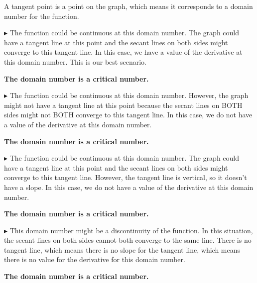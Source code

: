 \documentclass{ximera}
\begin{document}
A tangent point is a point on the graph, which means it corresponds to a domain number for the function. 


\textbf{\textcolor{blue!55!black}{$\blacktriangleright$}}  The function could be continuous at this domain number. The graph could have a tangent line at this point and the secant lines on both sides might converge to this tangent line.  In this case, we have a value of the derivative at this domain number. This is our best scenario. 

\begin{center}
\textbf{\textcolor{blue!55!black}{The domain number is a critical number.}}
\end{center}


\textbf{\textcolor{blue!55!black}{$\blacktriangleright$}}  The function could be continuous at this domain number.  However, the graph might not have a tangent line at this point because the secant lines on BOTH sides might not BOTH converge to this tangent line.  In this case, we do not have a value of the derivative at this domain number. 

\begin{center}
\textbf{\textcolor{blue!55!black}{The domain number is a critical number.}}
\end{center}

\textbf{\textcolor{blue!55!black}{$\blacktriangleright$}}  The function could be continuous at this domain number. The graph could have a tangent line at this point and the secant lines on both sides might converge to this tangent line.  However, the tangent line is vertical, so it doesn't have a slope. In this case, we do not have a value of the derivative at this domain number. 

\begin{center}
\textbf{\textcolor{blue!55!black}{The domain number is a critical number.}}
\end{center}

\textbf{\textcolor{blue!55!black}{$\blacktriangleright$}}  This domain number might be a discontinuity of the function. In this situation, the secant lines on both sides cannot both converge to the same line.  There is no tangent line, which means there is no slope for the tangent line, which means there is no value for the derivative for this domain number. 

\begin{center}
\textbf{\textcolor{blue!55!black}{The domain number is a critical number.}}
\end{center}
\end{document}
